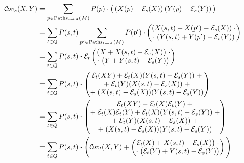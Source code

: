 \documentclass[a4paper]{article}
\theoremstyle{nonumberplain}
\begin{document}
\begin{align}
\mathcal{C}\!ov_{s}(X,Y) & = \sum_{p \in \mathrm{Paths}_{s \rightarrow A}(M)}{P(p) \cdot \big(\left(X(p) - \mathcal{E}_{s} (X)\right)\left(Y(p) - \mathcal{E}_{s} (Y)\right)\big)} \\
& = \sum_{t \in Q}{ P(s,t) \sum_{p' \in \mathrm{Paths}_{t \rightarrow A}(M)}{ P(p') \cdot \begin{pmatrix}
			(X(s,t) + X(p') - \mathcal{E}_{s}(X)) \;\cdot \\
			\cdot \;(Y(s,t) + Y(p') - \mathcal{E}_{s}(Y)) \\
		\end{pmatrix}}} \label{step1} \\
& = \sum_{t \in Q}{ P(s,t) \cdot \mathcal{E}_{t}\begin{pmatrix}
	\big(X + X(s,t) - \mathcal{E}_{s}(X)\big)\;\cdot \\
	\cdot\;\big(Y + Y(s,t) - \mathcal{E}_{s}(Y)\big) \\
	\end{pmatrix}} \label{step2}\\
& = \sum_{t \in Q}P(s,t) \cdot \begin{pmatrix}
\mathcal{E}_{t}(XY) + \mathcal{E}_{t}(X)(Y(s,t) - \mathcal{E}_{s}(Y)) \; + \\
+\; \mathcal{E}_{t}(Y)(X(s,t) - \mathcal{E}_{s}(X)) \; + \\
+\; (X(s,t) - \mathcal{E}_{s}(X))(Y(s,t) - \mathcal{E}_{s}(Y)) \\
\end{pmatrix} \label{step3} \\
& = \sum_{t \in Q}P(s,t) \cdot \begin{pmatrix}
\mathcal{E}_{t}(XY) - \mathcal{E}_{t}(X)\mathcal{E}_{t}(Y)\;+ \\
+\;\mathcal{E}_{t}(X)\mathcal{E}_{t}(Y) + \mathcal{E}_{t}(X)(Y(s,t) - \mathcal{E}_{s}(Y))\;+ \\
+\; \mathcal{E}_{t}(Y)(X(s,t) - \mathcal{E}_{s}(X))\;+ \\
+\; (X(s,t) - \mathcal{E}_{s}(X))(Y(s,t) - \mathcal{E}_{s}(Y)) \\
\end{pmatrix} \label{step4}\\
& = \sum_{t \in Q}P(s,t) \cdot \Bigg( \mathcal{C}\!ov_{t}(X,Y) + \begin{pmatrix}
		\mathcal{E}_{t}(X) + X(s,t) - \mathcal{E}_{s}(X)\big)\;\cdot \\
		\cdot\;\big(\mathcal{E}_{t}(Y) + Y(s,t) - \mathcal{E}_{s}(Y)\big) \\
	\end{pmatrix}\Bigg) \label{cov_recursive}
\end{align}
\end{document}
